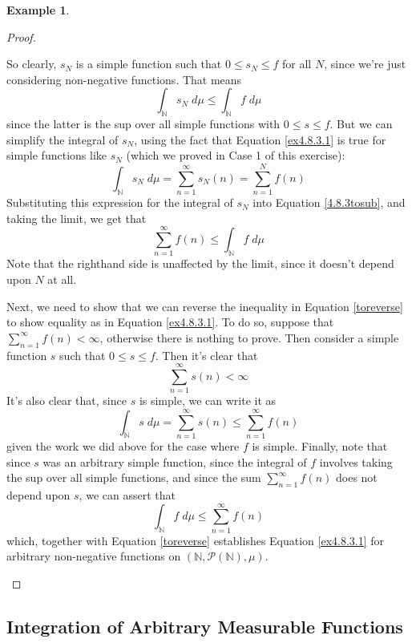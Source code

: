 \documentclass[12pt]{article}
\theoremstyle{plain}
\theoremstyle{definition}
\newtheorem{ex}[thm]{Example}
\theoremstyle{remark}
\begin{document}
\begin{ex}
\begin{proof}
\begin{enumerate}
So clearly, $s_N$ is a simple function such that $0\leq s_N \leq f$ for all $N$, since we're just considering non-negative functions. That means
\begin{equation}
    \label{4.8.3tosub}
    \int_\mathbb{N} s_N \;d\mu \leq
    \int_\mathbb{N} f \;d\mu 
\end{equation}
since the latter is the sup over all simple functions with $0\leq s\leq f$. But we can simplify the integral of $s_N$, using the fact that Equation \ref{ex4.8.3.1} is true for simple functions like $s_N$ (which we proved in Case 1 of this exercise):
    \[
        \int_\mathbb{N} s_N \;d\mu = \sum^\infty_{n=1}s_N(n) 
        = \sum^N_{n=1} f(n)
    \]
Substituting this expression for the integral of $s_N$ into Equation \ref{4.8.3tosub}, and taking the limit, we get that 
\begin{equation}
    \label{toreverse}
    \sum^\infty_{n=1} f(n) \leq \int_\mathbb{N} f\; d\mu 
\end{equation}
Note that the righthand side is unaffected by the limit, since it doesn't depend upon $N$ at all.

Next, we need to show that we can reverse the inequality in Equation \ref{toreverse} to show equality as in Equation \ref{ex4.8.3.1}. To do so, suppose that $\sum^\infty_{n=1} f(n)<\infty$, otherwise there is nothing to prove. Then consider a simple function $s$ such that $0\leq s \leq f$. Then it's clear that 
\[
    \sum^\infty_{n=1} s(n)<\infty
\]
It's also clear that, since $s$ is simple, we can write it as
\[
    \int_\mathbb{N} s \; d\mu = \sum^\infty_{n=1} s(n)
    \leq \sum^\infty_{n=1} f(n)
\]
given the work we did above for the case where $f$ is simple. Finally, note that since $s$ was an arbitrary simple function, since the integral of $f$ involves taking the sup over all simple functions, and since the sum $\sum^\infty_{n=1}f(n)$ does not depend upon $s$, we can assert that
\[
    \int_\mathbb{N} f \; d\mu \leq \sum^\infty_{n=1} f(n)
\]
which, together with Equation \ref{toreverse} establishes Equation \ref{ex4.8.3.1} for arbitrary non-negative functions on $(\mathbb{N}, \mathscr{P}(\mathbb{N}), \mu)$.
\end{enumerate}
\end{proof}
\end{ex}


\subsection{Integration of Arbitrary Measurable Functions}
\end{document}
